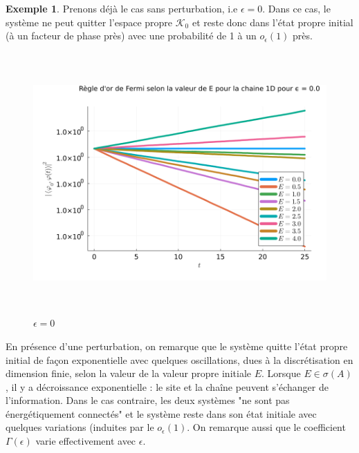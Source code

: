 \documentclass[12pt,openany,a4paper, titlepage]{article}
\theoremstyle{definition}
\theoremstyle{definition}
\theoremstyle{definition}
\newtheorem{ex}{Exemple}
\theoremstyle{definition}
\theoremstyle{definition}
\theoremstyle{definition}
\begin{document}
\begin{ex}
Prenons déjà le cas sans perturbation, i.e $\epsilon = 0$. Dans ce cas, le système ne peut quitter l'espace propre $\mathcal{K}_0$ et reste donc dans l'état propre initial (à un facteur de phase près) avec une probabilité de 1 à un $o_\epsilon(1)$ près.\\


\begin{figure}[h]
    \centering
        \includegraphics[height=10cm]{Règle d'or de Fermi pour la chaine 1D pour ϵ = 0.png}
        \caption{$\epsilon = 0$}
\end{figure}

En présence d'une perturbation, on remarque que le système quitte l'état propre initial de façon exponentielle avec quelques oscillations, dues à la discrétisation en dimension finie, selon la valeur de la valeur propre initiale $E$. Lorsque $E\in\sigma(A)$, il y a décroissance exponentielle : le site et la chaîne peuvent s'échanger de l'information. Dans le cas contraire, les deux systèmes "ne sont pas énergétiquement connectés" et le système reste dans son état initiale avec quelques variations (induites par le $o_\epsilon(1)$. On remarque aussi que le coefficient $\Gamma(\epsilon)$ varie effectivement avec $\epsilon$.


\end{ex}
\end{document}
